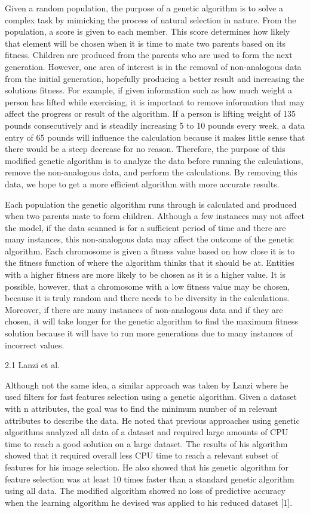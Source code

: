 \documentclass[conference]{IEEEtran}
\begin{document}
\large Given a random population, the purpose of a genetic algorithm is to solve a complex task by mimicking the process of natural selection in nature. From the population, a score is given to each member. This score determines how likely that element will be chosen when it is time to mate two parents based on its fitness. Children are produced from the parents who are used to form the next generation. However, one area of interest is in the removal of non-analogous data from the initial generation, hopefully producing a better result and increasing the solutions fitness. For example, if given information such as how much weight a person has lifted while exercising, it is important to remove information that may affect the progress or result of the algorithm. If a person is lifting weight of 135 pounds consecutively and is steadily increasing 5 to 10 pounds every week, a data entry of 65 pounds will influence the calculation because it makes little sense that there would be a steep decrease for no reason. Therefore, the purpose of this modified genetic algorithm is to analyze the data before running the calculations, remove the non-analogous data, and perform the calculations. By removing this data, we hope to get a more efficient algorithm with more accurate results. 

\large Each population the genetic algorithm runs through is calculated and produced when two parents mate to form children. Although a few instances may not affect the model, if the data scanned is for a sufficient period of time and there are many instances, this non-analogous data may affect the outcome of the genetic algorithm. Each chromosome is given a fitness value based on how close it is to the fitness function of where the algorithm thinks that it should be at. Entities with a higher fitness are more likely to be chosen as it is a higher value. It is possible, however, that a chromosome with a low fitness value may be chosen, because it is truly random and there needs to be diversity in the calculations. Moreover, if there are many instances of non-analogous data and if they are chosen, it will take longer for the genetic algorithm to find the maximum fitness solution because it will have to run more generations due to many instances of incorrect values.  


2.1 Lanzi et al.


\large Although not the same idea, a similar approach was taken by Lanzi where he used filters for fast features selection using a genetic algorithm. Given a dataset with n attributes, the goal was to find the minimum number of m relevant attributes to describe the data. He noted that previous approaches using genetic algorithms analyzed all data of a dataset and required large amounts of CPU time to reach a good solution on a large dataset. The results of his algorithm showed that it required overall less CPU time to reach a relevant subset of features for his image selection. He also showed that his genetic algorithm for feature selection was at least 10 times faster than a standard genetic algorithm using all data. The modified algorithm showed no loss of predictive accuracy when the learning algorithm he devised was applied to his reduced dataset [1]. 
\end{document}

